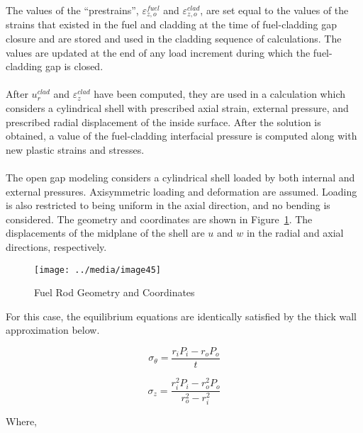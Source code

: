 The values of the ``prestrains'', $\varepsilon_{z,o}^{fuel}$ and $\varepsilon_{z,o}^{clad}$, are set
equal to the values of the strains that existed in the fuel and cladding at the time of
fuel-cladding gap closure and are stored and used in the cladding sequence of calculations. The
values are updated at the end of any load increment during which the fuel-cladding gap is closed.
\\
\\
After $u_{r}^{clad}$ and $\varepsilon_{z}^{clad}$ have been computed, they are used in a calculation
which considers a cylindrical shell with prescribed axial strain, external pressure, and prescribed
radial displacement of the inside surface.  After the solution is obtained, a value of the
fuel-cladding interfacial pressure is computed along with new plastic strains and stresses.
\\
\\
The open gap modeling considers a cylindrical shell loaded by both internal and external pressures.
Axisymmetric loading and deformation are assumed.  Loading is also restricted to being uniform in
the axial direction, and no bending is considered. The geometry and coordinates are shown in
Figure~\ref{fig:fuel_rod_geometry_and_coordinates}. The displacements of the midplane of the shell
are $u$ and $w$ in the radial and axial directions, respectively.

\begin{figure}
    \texttt{[image: ../media/image45]}
    \caption{Fuel Rod Geometry and Coordinates}
    \label{fig:fuel_rod_geometry_and_coordinates}
\end{figure}

For this case, the equilibrium equations are identically satisfied by the thick wall approximation
below.

\begin{equation}
    \label{eq:thick_wall_equilibrium_stress_hoop}
    \sigma_{\theta} = \frac{r_{i}P_{i} - r_{o}P_{o}}{t}
\end{equation}

\begin{equation}
    \label{eq:thick_wall_equilibrium_stress_axial}
    \sigma_{z} = \frac{r_{i}^{2}P_{i} - r_{o}^{2}P_{o}}{ r_{o}^{2} - r_{i}^{2}}
\end{equation}

Where,

